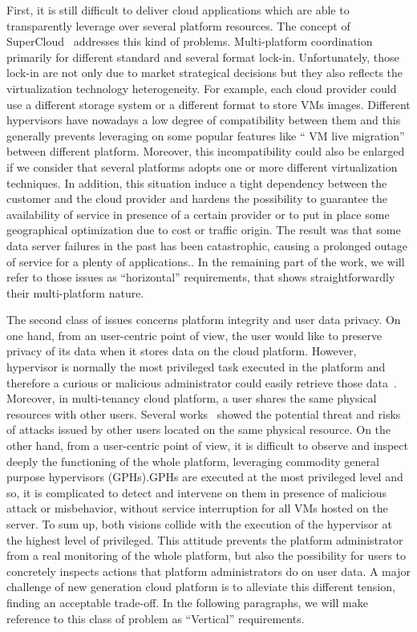 \documentclass{sig-alternate}
\begin{document}
First, it is still difficult to deliver cloud applications which are able to transparently leverage over several platform resources. The concept of SuperCloud~\cite{art:blan, xclo:blank} addresses this kind of problems. Multi-platform coordination primarily for different standard and several format lock-in. Unfortunately, those lock-in are not only due to market strategical decisions but they also reflects the virtualization technology heterogeneity. For example, each cloud provider could use a different storage system or a different format to store VMs images. Different hypervisors have nowadays a low degree of compatibility between them and this generally prevents leveraging on some popular features like `` VM live migration'' between different platform. Moreover, this incompatibility could also be enlarged if we consider that several platforms adopts one or more different virtualization techniques. In addition, this situation induce a tight dependency between the customer and the cloud provider and hardens the possibility to guarantee the availability of service in presence of a certain provider or to put in place some geographical optimization due to cost or traffic origin. The result was that some data server failures in the past has been catastrophic, causing a prolonged outage of service for a plenty of applications.. In the remaining part of the work, we will refer to those issues as ``horizontal'' requirements, that shows straightforwardly their multi-platform nature.

The second class of issues concerns platform integrity and user data privacy. On one hand, from an user-centric point of view, the user would like to preserve privacy of its data when it stores data on the cloud platform. However, hypervisor is normally the most privileged task executed in the platform and therefore a curious or malicious administrator could easily retrieve those data~\cite{cloudvisor:zhang}. Moreover, in multi-tenancy cloud platform, a user shares the same physical resources with other users. Several works~\cite{sec:you, bot:att} showed the potential threat and risks of attacks issued by other users located on the same physical resource.
On the other hand, from a user-centric point of view, it is difficult to observe and inspect deeply the functioning of the whole platform, leveraging commodity general purpose hypervisors (GPHs).GPHs are executed at the most privileged level and so, it is complicated to detect and intervene on them in presence of malicious attack or misbehavior, without service interruption for all VMs hosted on the server. 
To sum up, both visions collide with the execution of the hypervisor at the highest level of privileged. This attitude prevents the platform administrator from a real monitoring of the whole platform, but also the possibility for users to concretely inspects actions that platform administrators do on user data. A major challenge of new generation cloud platform is to alleviate this different tension, finding an acceptable trade-off. In the following paragraphs, we will make reference to this class of problem as ``Vertical'' requirements.
\end{document}
